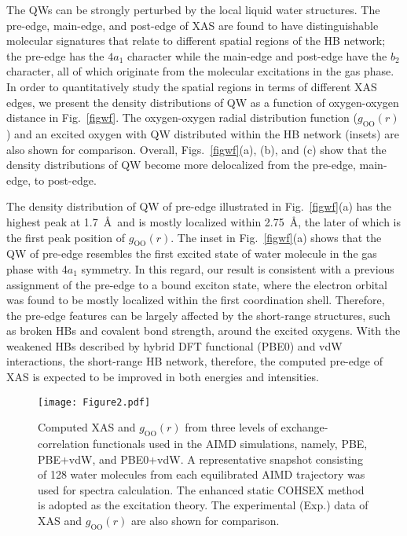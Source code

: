 \documentclass[prb,twocolumn,showpacs,preprintnumbers,superscriptaddress,amsmath,amssymb]{revtex4}
\begin{document}
The QWs can be strongly perturbed by the local liquid water structures.
The pre-edge, main-edge, and post-edge of XAS are found to
have distinguishable molecular signatures that
relate to different spatial regions of the HB network;\cite{Wernet995,chen2010PRLxas,nilsson2010x}
the pre-edge has the $4a_1$ character while
the main-edge and post-edge have the $b_2$ character, all of which
originate from the molecular excitations in the gas phase.\cite{Wernet995}
In order to quantitatively study the spatial regions in terms of different XAS edges,
we present the density distributions of QW as a function of oxygen-oxygen distance in Fig.~\ref{figwf}.
The oxygen-oxygen radial distribution function ($g_{\mathrm{OO}}(r)$)
and an excited oxygen with QW distributed within the HB network (insets) are also shown for comparison.
Overall, Figs.~\ref{figwf}(a), (b), and (c) show that the density distributions of QW
become more delocalized from the pre-edge, main-edge, to post-edge.


The density distribution of QW of pre-edge illustrated in
Fig.~\ref{figwf}(a) has the highest peak at 1.7~\AA~and is mostly localized within 2.75~\AA,
the later of which is the first peak position of $g_{\mathrm{OO}}(r)$.
The inset in Fig.~\ref{figwf}(a) shows that the QW of pre-edge
resembles the first excited state of water molecule in the gas phase with 4$a_1$ symmetry.
In this regard, our result is consistent with a previous assignment\cite{chen2010PRLxas}
of the pre-edge to a bound exciton state, where
the electron orbital was found to be mostly localized within the first coordination shell.
Therefore, the pre-edge features can be largely affected by the short-range structures,
such as broken HBs and covalent bond strength, around the excited oxygens.
With the weakened HBs described by hybrid DFT functional (PBE0) and vdW interactions, the short-range HB network,
therefore, the computed pre-edge of XAS is expected to be improved in both energies and intensities.

\begin{figure*}
  \texttt{[image: Figure2.pdf]}
  \caption{Computed XAS and $g_{\mathrm{OO}}(r)$ from three levels of 
  exchange-correlation functionals used in the AIMD simulations, namely,
PBE, PBE+vdW, and PBE0+vdW.
A representative snapshot consisting of 128 water molecules 
from each equilibrated AIMD trajectory was used for spectra calculation.
The enhanced static COHSEX method is adopted as the excitation theory.
The experimental (Exp.) data of XAS\cite{schreck2016isotope} 
and $g_{\mathrm{OO}}(r)$\cite{skinner2013benchmark} are also shown for comparison.
}
  \label{figAIMD}
\end{figure*}
\end{document}
